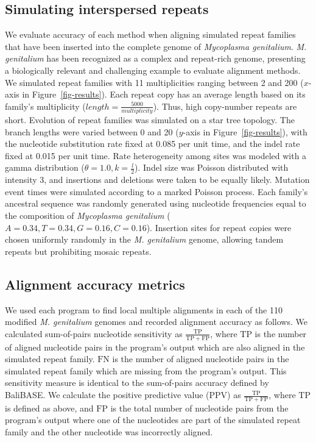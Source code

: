 \documentclass{ws-procs975x65}
\begin{document}
\subsection{Simulating interspersed repeats}
We evaluate accuracy of each method when aligning simulated repeat
families that have been inserted into the complete genome of
\emph{Mycoplasma genitalium}. \emph{M. genitalium} has been recognized
as a complex and repeat-rich genome, presenting a biologically
relevant and challenging example to evaluate alignment
methods\cite{ref-mycoplasma}. We simulated repeat families with 11
multiplicities ranging between 2 and 200 ($x$-axis in
Figure~\ref{fig-results}).  Each repeat copy has an average length
based on its family's multiplicity
($length=\frac{5000}{multiplicity}$).  Thus, high copy-number repeats
are short.  Evolution of repeat families was simulated on a star tree
topology.  The branch lengths were varied between 0 and 20 ($y$-axis
in Figure~\ref{fig-results}), with the nucleotide substitution rate
fixed at 0.085 per unit time, and the indel rate fixed at 0.015 per
unit time.  Rate heterogeneity among sites was modeled with a gamma
distribution ($\theta = 1.0, k = \frac{l}{2}$).  Indel size was
Poisson distributed with intensity 3, and insertions and deletions
were taken to be equally likely.  Mutation event times were simulated
according to a marked Poisson process.  Each family's ancestral
sequence was randomly generated using nucleotide frequencies equal to
the composition of \emph{Mycoplasma genitalium}
($A=0.34,T=0.34,G=0.16,C=0.16$). Insertion sites for repeat copies
were chosen uniformly randomly in the \textit{M. genitalium} genome,
allowing tandem repeats but prohibiting mosaic repeats.

\subsection{Alignment accuracy metrics}
We used each program to find local multiple alignments in each of the
110 modified \emph{M. genitalium} genomes and recorded alignment
accuracy as follows. We calculated sum-of-pairs nucleotide sensitivity
as $\frac{\mathrm{TP}}{\mathrm{TP} + \mathrm{FP}}$, where
$\mathrm{TP}$ is the number of aligned nucleotide pairs in the
program's output which are also aligned in the simulated repeat
family.  $\mathrm{FN}$ is the number of aligned nucleotide pairs in
the simulated repeat family which are missing from the program's
output.  This sensitivity measure is identical to the sum-of-pairs
accuracy defined by BaliBASE\cite{ref-balibase}.  We calculate the
positive predictive value (PPV) as $\frac{\mathrm{TP}}{\mathrm{TP} +
\mathrm{FP}}$, where $\mathrm{TP}$ is defined as above, and
$\mathrm{FP}$ is the total number of nucleotide pairs from the
program's output where one of the nucleotides are part of the
simulated repeat family and the other nucleotide was incorrectly
aligned.
\end{document}
